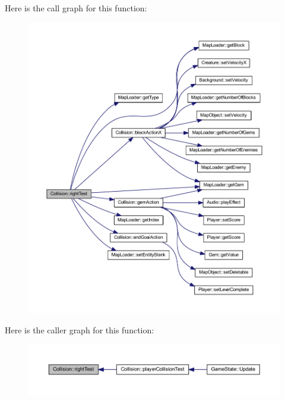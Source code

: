 Here is the call graph for this function\+:
\nopagebreak
\begin{figure}[H]
\begin{center}
\leavevmode
\includegraphics[width=350pt]{class_collision_a5aff01e79c9c42e7d71a57de7412dc58_cgraph}
\end{center}
\end{figure}




Here is the caller graph for this function\+:
\nopagebreak
\begin{figure}[H]
\begin{center}
\leavevmode
\includegraphics[width=350pt]{class_collision_a5aff01e79c9c42e7d71a57de7412dc58_icgraph}
\end{center}
\end{figure}


